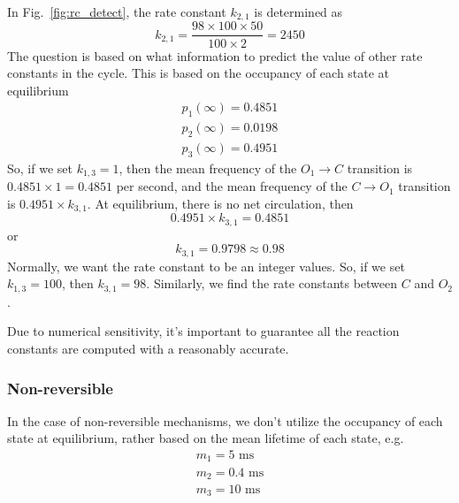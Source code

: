 In Fig.~\ref{fig:rc_detect}, the rate constant $k_{2,1}$ is determined
as
\begin{equation}
  \label{eq:879}
  k_{2,1} = \frac{98\times 100\times 50}{100\times 2} = 2450
\end{equation}
The question is based on what information to predict the value of
other rate constants in the cycle. This is based on the occupancy of
each state at equilibrium
\begin{equation}
  \label{eq:880}
  \begin{split}
    p_1(\infty) = 0.4851\\
    p_2(\infty) = 0.0198\\
    p_3(\infty) = 0.4951
  \end{split}
\end{equation}
So, if we set $k_{1,3}=1$, then the mean frequency of the
$O_1\rightarrow C$ transition is $0.4851\times 1 = 0.4851$ per second,
and the mean frequency of the $C\rightarrow O_1$ transition is
$0.4951\times k_{3,1}$. At equilibrium, there is no net circulation,
then
\begin{equation}
  \label{eq:881}
  0.4951\times k_{3,1} = 0.4851
\end{equation}
or
\begin{equation}
  \label{eq:882}
  k_{3,1} = 0.9798 \approx 0.98
\end{equation}
Normally, we want the rate constant to be an integer values. So, if we
set $k_{1,3}=100$, then $k_{3,1} = 98$. Similarly, we find the rate
constants between $C$ and $O_2$.

\begin{framed}
  Due to numerical sensitivity, it's important to guarantee all the
  reaction constants are computed with a reasonably accurate.
\end{framed}

\subsubsection{Non-reversible}
\label{sec:non-revers-mech}

In the case of non-reversible mechanisms, we don't utilize the
occupancy of each state at equilibrium, rather based on the mean
lifetime of each state, e.g.
\begin{equation}
  \label{eq:883}
  \begin{split}
    m_1 = 5 \text{ ms} \\
    m_2 = 0.4 \text{ ms} \\
    m_3 = 10 \text{ ms}
  \end{split}
\end{equation}

